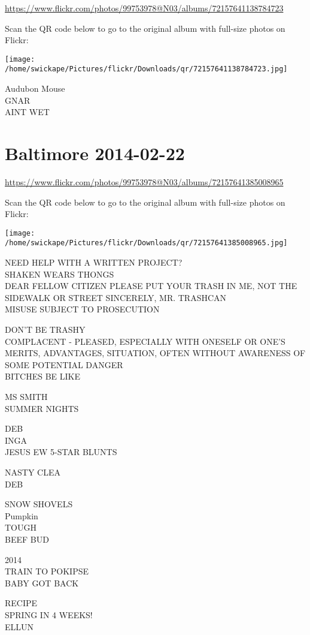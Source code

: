\documentclass[10pt,letterpaper]{article}
\begin{document}
\url{https://www.flickr.com/photos/99753978@N03/albums/72157641138784723}

Scan the QR code below to go to the original album with full-size photos on Flickr:

\texttt{[image: /home/swickape/Pictures/flickr/Downloads/qr/72157641138784723.jpg]}


Audubon Mouse\\
GNAR\\
AINT WET


\section*{Baltimore 2014-02-22}

\url{https://www.flickr.com/photos/99753978@N03/albums/72157641385008965}

Scan the QR code below to go to the original album with full-size photos on Flickr:

\texttt{[image: /home/swickape/Pictures/flickr/Downloads/qr/72157641385008965.jpg]}


NEED HELP WITH A WRITTEN PROJECT?\\
SHAKEN WEARS THONGS\\
DEAR FELLOW CITIZEN PLEASE PUT YOUR TRASH IN ME, NOT THE SIDEWALK OR STREET SINCERELY, MR. TRASHCAN\\
MISUSE SUBJECT TO PROSECUTION

DON'T BE TRASHY\\
COMPLACENT {-} PLEASED, ESPECIALLY WITH ONESELF OR ONE'S MERITS, ADVANTAGES, SITUATION, OFTEN WITHOUT AWARENESS OF SOME POTENTIAL DANGER\\
BITCHES BE LIKE

MS SMITH\\
SUMMER NIGHTS

DEB\\
INGA\\
JESUS EW 5{-}STAR BLUNTS

NASTY CLEA\\
DEB

SNOW SHOVELS\\
Pumpkin\\
TOUGH\\
BEEF BUD

2014\\
TRAIN TO POKIPSE\\
BABY GOT BACK

RECIPE\\
SPRING IN 4 WEEKS!\\
ELLUN
\end{document}
